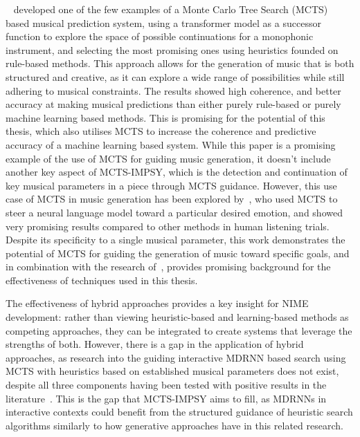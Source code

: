 ~\cite{Fu2023MCTS} developed one of the few examples of a Monte Carlo Tree Search (MCTS) based musical prediction system, using a transformer model as a successor function to explore the space of possible continuations for a monophonic instrument, and selecting the most promising ones using heuristics founded on rule-based methods. This approach allows for the generation of music that is both structured and creative, as it can explore a wide range of possibilities while still adhering to musical constraints. The results showed high coherence, and better accuracy at making musical predictions than either purely rule-based or purely machine learning based methods. This is promising for the potential of this thesis, which also utilises MCTS to increase the coherence and predictive accuracy of a machine learning based system. While this paper is a promising example of the use of MCTS for guiding music generation, it doesn't include another key aspect of MCTS-IMPSY, which is the detection and continuation of key musical parameters in a piece through MCTS guidance. However, this use case of MCTS in music generation has been explored by~\cite{Ferreira2022LmMcts}, who used MCTS to steer a neural language model toward a particular desired emotion, and showed very promising results compared to other methods in human listening trials. Despite its specificity to a single musical parameter, this work demonstrates the potential of MCTS for guiding the generation of music toward specific goals, and in combination with the research of~\cite{Fu2023MCTS}, provides promising background for the effectiveness of techniques used in this thesis.

The effectiveness of hybrid approaches provides a key insight for NIME development: rather than viewing heuristic-based and learning-based methods as competing approaches, they can be integrated to create systems that leverage the strengths of both. However, there is a gap in the application of hybrid approaches, as research into the guiding interactive MDRNN based search using MCTS with heuristics based on established musical parameters does not exist, despite all three components having been tested with positive results in the literature~\citep{Martin2019IMPSY, Fu2023MCTS, Ferreira2022LmMcts}. This is the gap that MCTS-IMPSY aims to fill, as MDRNNs in interactive contexts could benefit from the structured guidance of heuristic search algorithms similarly to how generative approaches have in this related research.

